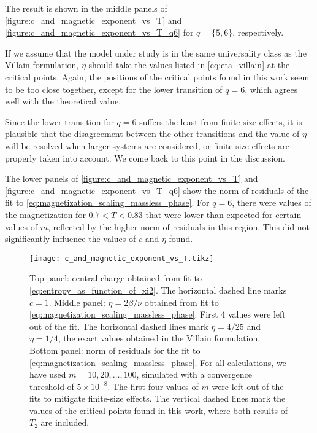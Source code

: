 The result is shown in the middle panels of \autoref{figure:c_and_magnetic_exponent_vs_T} and
\autoref{figure:c_and_magnetic_exponent_vs_T_q6} for $q = \{5, 6\}$,
respectively.

If we assume that the model under study is in the same universality class as the Villain formulation,
$\eta$ should take the values listed in \autoref{eq:eta_villain} at the critical points.
Again, the positions of the critical points found in this work seem to be too close together,
except for the lower transition of $q = 6$, which agrees well with the theoretical value.

Since the lower transition for $q = 6$ suffers the least from finite-size effects,
it is plausible that the disagreement between the other transitions and the value of $\eta$ will be resolved when larger
systems are considered, or finite-size effects are properly taken into account.
We come back to this point in the discussion.

The lower panels of \autoref{figure:c_and_magnetic_exponent_vs_T} and \autoref{figure:c_and_magnetic_exponent_vs_T_q6}
show the norm of residuals of the fit to \autoref{eq:magnetization_scaling_massless_phase}.
For $q = 6$, there were values of the magnetization for $0.7 < T < 0.83$ that were lower than expected
for certain values of $m$, reflected by the higher norm of residuals in this region.
This did not significantly influence the values of $c$ and $\eta$ found.

\begin{figure}
  \centering
  \texttt{[image: c\_and\_magnetic\_exponent\_vs\_T.tikz]}
  \caption{Top panel: central charge obtained from fit to \autoref{eq:entropy_as_function_of_xi2}. The horizontal dashed line marks $c = 1$.
  Middle panel: $\eta = 2 \beta / \nu$ obtained from fit to \autoref{eq:magnetization_scaling_massless_phase}.
  First 4 values were left out of the fit.
  The horizontal dashed lines mark $\eta = 4/25$ and $\eta = 1/4$, the exact values obtained in the Villain formulation.
  Bottom panel: norm of residuals for the fit to \autoref{eq:magnetization_scaling_massless_phase}.
  For all calculations, we have used $m = 10, 20, \dots, 100$, simulated with a convergence threshold of $5 \times
  10^{-8}$. The first four values of $m$ were left out of the fits to mitigate finite-size effects.
  The vertical dashed lines mark the values of the critical points found in this work,
  where both results of $T_2$ are included.
}\label{figure:c_and_magnetic_exponent_vs_T}
\end{figure}

